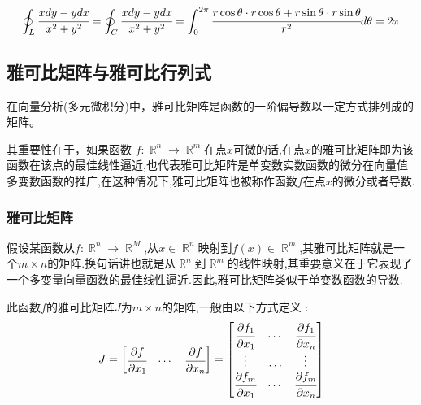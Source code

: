 \documentclass[UTF8,12pt]{ctexbook}
\newcommand{\defFunction}[1]{f(#1)}
\newcommand{\definiteIntegral}[2]{\int^{#1}_{#2}}
\newcommand{\partialDerivativeFrac}[2]{\cfrac{\partial #1}{\partial #2}}
\newcommand{\curveIntegralOnLine}[1]{\oint_{#1}}
\DeclareMathOperator{\mathRealNumberCollection}{\mathbb{R}}
\begin{document}
{{{{\begin{enumerate}
{\begin{enumerate}
{\begin{enumerate}
{                              $$
                                \curveIntegralOnLine{L}\cfrac{xdy - ydx}{x^2 + y^2} = \curveIntegralOnLine{C}\cfrac{xdy - ydx}{x^2 + y^2} = \definiteIntegral{2\pi}{0}\cfrac{r\cos\theta \cdot r\cos\theta + r\sin\theta \cdot r\sin\theta}{r^2}d\theta = 2\pi
                              $$
                              }
                      \end{enumerate}
                      }
              \end{enumerate}
              }
      \end{enumerate}
    }%

  }%

  \subsection{雅可比矩阵与雅可比行列式}{
    在向量分析(多元微积分)中，雅可比矩阵是函数的一阶偏导数以一定方式排列成的矩阵。

    其重要性在于，如果函数 $f:\mathRealNumberCollection^n \to \mathRealNumberCollection^m$在点$x$可微的话,在点$x$的雅可比矩阵即为该函数在该点的最佳线性逼近,也代表雅可比矩阵是单变数实数函数的微分在向量值多变数函数的推广,在这种情况下,雅可比矩阵也被称作函数$f$在点$x$的微分或者导数.

    \subsubsection{雅可比矩阵}{
      假设某函数从$f : \mathRealNumberCollection^n \to \mathRealNumberCollection^M$,从$x\in\mathRealNumberCollection^n$映射到$\defFunction{x}\in\mathRealNumberCollection^m$,其雅可比矩阵就是一个$m \times n$的矩阵.换句话讲也就是从$\mathRealNumberCollection^n$到$\mathRealNumberCollection^m$的线性映射,其重要意义在于它表现了一个多变量向量函数的最佳线性逼近.因此,雅可比矩阵类似于单变数函数的导数.

      此函数$f$的雅可比矩阵$J$为$m \times n$的矩阵,一般由以下方式定义 :
      $$
        J =
        \begin{bmatrix}
          \partialDerivativeFrac{f}{x_1} & \dotsm & \partialDerivativeFrac{f}{x_n}
        \end{bmatrix}
        =
        \begin{bmatrix}
          \partialDerivativeFrac{f_1}{x_1} & \dotsm & \partialDerivativeFrac{f_1}{x_n} \\
          \vdots                           & \ldots & \vdots                           \\
          \partialDerivativeFrac{f_m}{x_1} & \dotsm & \partialDerivativeFrac{f_m}{x_n}
        \end{bmatrix}
      $$

}}}}
\end{document}
